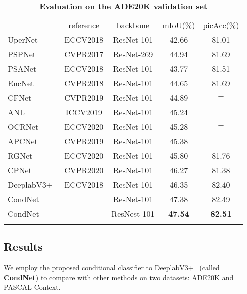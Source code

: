 \documentclass[journal]{IEEEtran}
\begin{document}
\begin{table}[t]
\centering
\setlength{\tabcolsep}{2.0pt}
\small
\renewcommand{\arraystretch}{1.4}
\caption{\textbf{Evaluation on
	the ADE20K validation set}}
\label{tab:ade20k}
\begin{tabular}{l|c|c|c|c}
\shline
\multicolumn{1}{c|}{model} & reference & backbone & mIoU($\%$) & picAcc($\%$)\\ 
\shline
UperNet~\cite{Xiao-UperNet-ECCV-2018}   & ECCV2018 & ResNet-101 & 42.66 & 81.01 \\
PSPNet~\cite{Zhao-CVPR-PSPNet-2017}    & CVPR2017 & ResNet-269 & 44.94 & 81.69 \\
PSANet~\cite{Zhao-ECCV-PSANet-2018}    & ECCV2018 & ResNet-101 & 43.77 & 81.51 \\
EncNet~\cite{Zhang-CVPR-EncNet-2018}    & CVPR2018 & ResNet-101 & 44.65 & 81.69 \\
CFNet~\cite{Zhang-CVPR-CFNet-2019}     & CVPR2019 & ResNet-101 & 44.89 & $-$ \\
ANL~\cite{Zhu-ICCV-ANL-2019}       & ICCV2019 & ResNet-101 & 45.24 & $-$ \\
OCRNet~\cite{Yuan-ECCV-OCRNet-2019}    & ECCV2020 & ResNet-101 & 45.28 & $-$ \\
APCNet~\cite{He-CVPR-APCNet-2019}    & CVPR2019 & ResNet-101 & 45.38 & $-$ \\
RGNet~\cite{Yu-ECCV-RepGraph-2020}     & ECCV2020 & ResNet-101 & 45.80 & 81.76 \\
CPNet~\cite{Yu-CVPR-CPNet-2020}    & CVPR2020 & ResNet-101 & 46.27 & 81.38 \\
DeeplabV3+~\cite{Chen-ECCV-Deeplabv3p-2018} & ECCV2018 & ResNet-101 & 46.35 & 82.40 \\
\hline
CondNet	  & & ResNet-101  & \underline{47.38} & \underline{82.49} \\
CondNet	  & & ResNest-101 & \textbf{47.54} & \textbf{82.51} \\
\shline	
\end{tabular}
\end{table}	


\subsection{Results}
We employ the proposed conditional classifier to 
DeeplabV3+~\cite{Chen-ECCV-Deeplabv3p-2018} (called \textbf{CondNet}) to 
compare with other methods 
on two datasets: ADE20K and PASCAL-Context.
\end{document}
